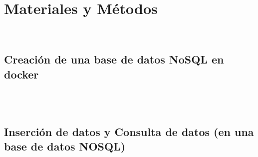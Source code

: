 \documentclass[twoside,onecolumn]{article}
\begin{document}
\section{Materiales y Métodos}
\begin{flushright}
\begin{itemize}
\textbf{}\\
\subsection{Creación de una base de datos NoSQL en docker}
\textbf{}\\


\textbf{}\\
\subsection{Inserción de datos y Consulta de datos (en una base de datos NOSQL)}
\textbf{}\\



\textbf{}\\

\end{itemize}
\end{flushright}
\end{document}
